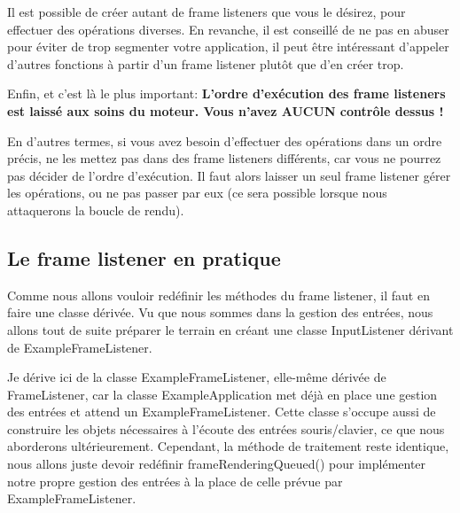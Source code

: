 Il est possible de cr\'eer autant de frame listeners que vous le d\'esirez, pour effectuer des op\'erations diverses. En revanche, il est conseill\'e de ne pas en abuser pour \'eviter de trop segmenter votre application, il peut \^etre int\'eressant d'appeler d'autres fonctions \`{a} partir d'un frame listener plut\^ot que d'en cr\'eer trop.

Enfin, et c'est l\`{a} le plus important:
\textbf{L'ordre d'ex\'ecution des frame listeners est laiss\'e aux soins du moteur. Vous n'avez AUCUN contr\^ole dessus !}

En d'autres termes, si vous avez besoin d'effectuer des op\'erations dans un ordre pr\'ecis, ne les mettez pas dans des frame listeners diff\'erents, car vous ne pourrez pas d\'ecider de l'ordre d'ex\'ecution. Il faut alors laisser un seul frame listener g\'erer les op\'erations, ou ne pas passer par eux (ce sera possible lorsque nous attaquerons la boucle de rendu).



\subsection{Le frame listener en pratique}

Comme nous allons vouloir red\'efinir les m\'ethodes du frame listener, il faut en faire une classe d\'eriv\'ee. Vu que nous sommes dans la gestion des entr\'ees, nous allons tout de suite pr\'eparer le terrain en cr\'eant une classe InputListener d\'erivant de ExampleFrameListener.

Je d\'erive ici de la classe ExampleFrameListener, elle-m\^eme d\'eriv\'ee de FrameListener, car la classe ExampleApplication met d\'ej\`{a} en place une gestion des entr\'ees et attend un ExampleFrameListener. Cette classe s'occupe aussi de construire les objets n\'ecessaires \`{a} l'\'ecoute des entr\'ees souris/clavier, ce que nous aborderons ult\'erieurement.
Cependant, la m\'ethode de traitement reste identique, nous allons juste devoir red\'efinir frameRenderingQueued() pour impl\'ementer notre propre gestion des entr\'ees \`{a} la place de celle pr\'evue par ExampleFrameListener.


